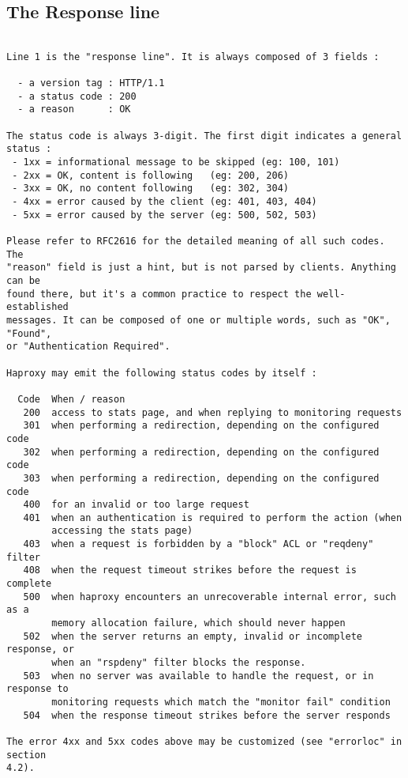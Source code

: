 
\subsection{The Response line}

\begin{verbatim}

Line 1 is the "response line". It is always composed of 3 fields :

  - a version tag : HTTP/1.1
  - a status code : 200
  - a reason      : OK

The status code is always 3-digit. The first digit indicates a general status :
 - 1xx = informational message to be skipped (eg: 100, 101)
 - 2xx = OK, content is following   (eg: 200, 206)
 - 3xx = OK, no content following   (eg: 302, 304)
 - 4xx = error caused by the client (eg: 401, 403, 404)
 - 5xx = error caused by the server (eg: 500, 502, 503)

Please refer to RFC2616 for the detailed meaning of all such codes. The
"reason" field is just a hint, but is not parsed by clients. Anything can be
found there, but it's a common practice to respect the well-established
messages. It can be composed of one or multiple words, such as "OK", "Found",
or "Authentication Required".

Haproxy may emit the following status codes by itself :

  Code  When / reason
   200  access to stats page, and when replying to monitoring requests
   301  when performing a redirection, depending on the configured code
   302  when performing a redirection, depending on the configured code
   303  when performing a redirection, depending on the configured code
   400  for an invalid or too large request
   401  when an authentication is required to perform the action (when
        accessing the stats page)
   403  when a request is forbidden by a "block" ACL or "reqdeny" filter
   408  when the request timeout strikes before the request is complete
   500  when haproxy encounters an unrecoverable internal error, such as a
        memory allocation failure, which should never happen
   502  when the server returns an empty, invalid or incomplete response, or
        when an "rspdeny" filter blocks the response.
   503  when no server was available to handle the request, or in response to
        monitoring requests which match the "monitor fail" condition
   504  when the response timeout strikes before the server responds

The error 4xx and 5xx codes above may be customized (see "errorloc" in section
4.2).


\end{verbatim}
